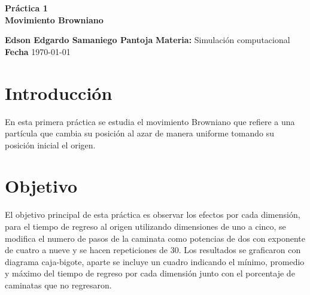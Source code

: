 \documentclass[a4paper, 11pt]{article}
\begin{document}
\begin{center}
\LARGE \bf Pr\'actica 1\\ Movimiento Browniano
\end{center}

\vspace{1cm} 
\noindent\textbf {Edson Edgardo Samaniego Pantoja} \hfill \textbf{Materia:} Simulación computacional 
\hfill \\
\textbf{Fecha} \today  
\vspace{1cm} 

\section{Introducción}
En esta primera pr\'actica se estudia el movimiento Browniano que refiere a una partícula que cambia su posición al azar de manera uniforme tomando su posición inicial el origen.

\section{Objetivo}
El objetivo principal de esta pr\'actica es observar los efectos por cada dimensión, para el tiempo de regreso al origen utilizando dimensiones de uno a cinco, se modifica el numero de pasos de la caminata como potencias de dos con exponente de cuatro a nueve y se hacen repeticiones de 30. Los resultados se graficaron con diagrama caja-bigote, aparte se incluye un cuadro indicando el mínimo, promedio y máximo del tiempo de regreso por cada dimensión junto con el porcentaje de caminatas que no regresaron. 
\end{document}
